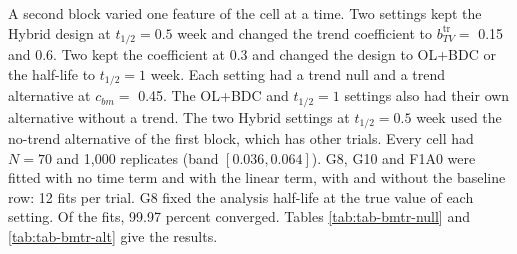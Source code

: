 \documentclass[
  11pt,
]{article}
\begin{document}
A second block varied one feature of the cell at a time. Two settings
kept the Hybrid design at \(t_{1/2} = 0.5\) week and changed the trend
coefficient to \(b_{TV}^{\mathrm{tr}} =\) 0.15 and
0.6. Two kept the coefficient at 0.3 and changed the
design to OL+BDC or the half-life to \(t_{1/2} = 1\) week. Each setting
had a trend null and a trend alternative at \(c_{bm} =\)
0.45. The OL+BDC and \(t_{1/2} = 1\) settings also had their
own alternative without a trend. The two Hybrid settings at
\(t_{1/2} = 0.5\) week used the no-trend alternative of the first block,
which has other trials. Every cell had \(N = 70\) and 1,000
replicates (band \([0.036, 0.064]\)). G8, G10 and F1A0 were fitted with
no time term and with the linear term, with and without the baseline
row: 12 fits per trial. G8 fixed the analysis half-life at the true
value of each setting. Of the fits, 99.97 percent
converged. Tables \ref{tab:tab-bmtr-null} and
\ref{tab:tab-bmtr-alt} give the results.
\end{document}
